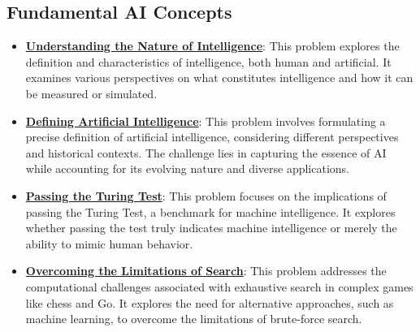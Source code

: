 \documentclass{article}%
\begin{document}
\subsection{Fundamental AI Concepts}%
\label{subsec:FundamentalAIConcepts}%
\begin{itemize}[leftmargin=*]%
\item \href{https://purdue.brightspace.com/d2l/common/assets/pdfjs-d2l-dist/1.0.14-legacy/web/viewer.html?file=\%2Fcontent\%2Fenforced\%2F1095467-wl.202510.CS.24300.001\%2F02L2-Intro.pdf\%3Fou\%3D1095467\&lang=en-us\&container=d2l-fileviewer-rendered-pdf\&fullscreen=d2l-fileviewer-rendered-pdf-dialog\&height=667#page=5}{\textbf{Understanding the Nature of Intelligence}}: This problem explores the definition and characteristics of intelligence, both human and artificial. It examines various perspectives on what constitutes intelligence and how it can be measured or simulated.%
\item \href{https://purdue.brightspace.com/d2l/common/assets/pdfjs-d2l-dist/1.0.14-legacy/web/viewer.html?file=\%2Fcontent\%2Fenforced\%2F1095467-wl.202510.CS.24300.001\%2F02L2-Intro.pdf\%3Fou\%3D1095467\&lang=en-us\&container=d2l-fileviewer-rendered-pdf\&fullscreen=d2l-fileviewer-rendered-pdf-dialog\&height=667#page=5}{\textbf{Defining Artificial Intelligence}}: This problem involves formulating a precise definition of artificial intelligence, considering different perspectives and historical contexts. The challenge lies in capturing the essence of AI while accounting for its evolving nature and diverse applications.%
\item \href{https://purdue.brightspace.com/d2l/common/assets/pdfjs-d2l-dist/1.0.14-legacy/web/viewer.html?file=\%2Fcontent\%2Fenforced\%2F1095467-wl.202510.CS.24300.001\%2F02L2-Intro.pdf\%3Fou\%3D1095467\&lang=en-us\&container=d2l-fileviewer-rendered-pdf\&fullscreen=d2l-fileviewer-rendered-pdf-dialog\&height=667#page=6}{\textbf{Passing the Turing Test}}: This problem focuses on the implications of passing the Turing Test, a benchmark for machine intelligence. It explores whether passing the test truly indicates machine intelligence or merely the ability to mimic human behavior.%
\item \href{https://purdue.brightspace.com/d2l/common/assets/pdfjs-d2l-dist/1.0.14-legacy/web/viewer.html?file=\%2Fcontent\%2Fenforced\%2F1095467-wl.202510.CS.24300.001\%2F02L2-Intro.pdf\%3Fou\%3D1095467\&lang=en-us\&container=d2l-fileviewer-rendered-pdf\&fullscreen=d2l-fileviewer-rendered-pdf-dialog\&height=667#page=11}{\textbf{Overcoming the Limitations of Search}}: This problem addresses the computational challenges associated with exhaustive search in complex games like chess and Go. It explores the need for alternative approaches, such as machine learning, to overcome the limitations of brute-force search.%

\end{itemize}
\end{document}
